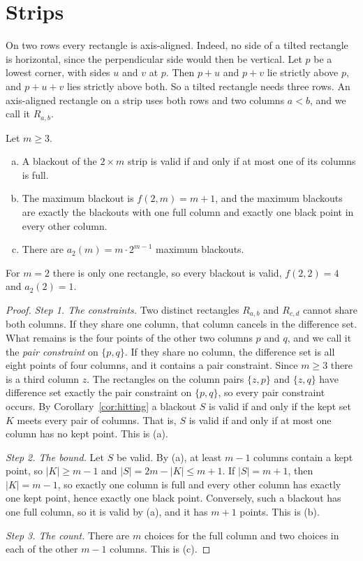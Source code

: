 \section{Strips}\label{sec:strip}

On two rows every rectangle is axis-aligned. Indeed, no side of a tilted rectangle
is horizontal, since the perpendicular side would then be vertical. Let $p$ be a
lowest corner, with sides $u$ and $v$ at $p$. Then $p+u$ and $p+v$ lie strictly
above $p$, and $p+u+v$ lies strictly above both. So a tilted rectangle needs three
rows.
An axis-aligned rectangle on a strip uses both rows and two columns $a<b$, and we
call it $R_{a,b}$.

\begin{theorem}\label{thm:strip}
Let $m\ge3$.
\begin{enumerate}[(a)]
\item A blackout of the $2\times m$ strip is valid if and only if at most one of its
columns is full.
\item The maximum blackout is $f(2,m)=m+1$, and the maximum blackouts are exactly the
blackouts with one full column and exactly one black point in every other column.
\item There are $a_2(m)=m\cdot2^{m-1}$ maximum blackouts.
\end{enumerate}
For $m=2$ there is only one rectangle, so every blackout is valid, $f(2,2)=4$ and
$a_2(2)=1$.
\end{theorem}

\begin{proof}
\emph{Step 1. The constraints.} Two distinct rectangles $R_{a,b}$ and $R_{c,d}$
cannot share both columns. If they share one column, that column cancels in the
difference set. What remains is the four points of the other two columns $p$ and
$q$, and we call it the \emph{pair constraint} on $\{p,q\}$. If they share no
column, the difference set is all eight points of four columns, and it contains a
pair constraint. Since $m\ge3$ there is a third column $z$. The rectangles on the
column pairs $\{z,p\}$ and $\{z,q\}$ have difference set exactly the pair
constraint on $\{p,q\}$, so every pair constraint occurs. By Corollary~\ref{cor:hitting} a
blackout $S$ is valid if and only if the kept set $K$ meets every pair of columns.
That is, $S$ is valid if and only if at most one column has no kept point. This is
(a).

\emph{Step 2. The bound.} Let $S$ be valid. By (a), at least $m-1$ columns contain a
kept point, so $|K|\ge m-1$ and $|S|=2m-|K|\le m+1$. If $|S|=m+1$, then $|K|=m-1$,
so exactly one column is full and every other column has exactly one kept point,
hence exactly one black point. Conversely, such a blackout has one full column, so
it is valid by (a), and it has $m+1$ points. This is (b).

\emph{Step 3. The count.} There are $m$ choices for the full column and two choices
in each of the other $m-1$ columns. This is (c).
\end{proof}

